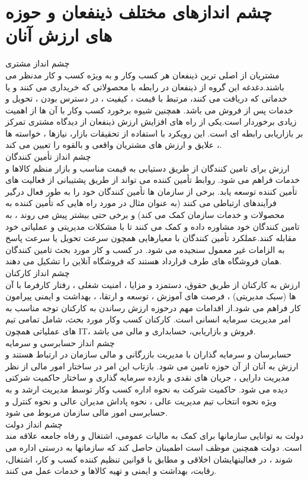\documentclass[12pt]{report}
\begin{document}
\section{چشم اندازهای مختلف ذینفعان و حوزه های ارزش آنان}
چشم انداز مشتری\\
مشتریان از اصلی ترین ذینفعان هر کسب وکار و به ویژه کسب و کار مدنظر می باشند.دغدغه این گروه از ذینفعان در رابطه با محصولاتی که خریداری می کنند و یا خدماتی که دریافت می کنند، مرتبط با قیمت ، کیفیت ، در دسترس بودن ، تحویل و خدمات پس از فروش می باشد. همچنین شیوه برخورد کسب وکار با آن ها از اهمیت زیادی برخوردار است.یکی از راه های افزایش ارزش ذینفعان از دیدگاه مشتری تمرکز بر بازاریابی رابطه ای است. این رویکرد با استفاده از تحقیقات بازار، نیازها ، خواسته ها ، علایق و ارزش های مشتریان واقعی و بالقوه را تعیین می کند.\\
چشم انداز تأمین کنندگان\\
ارزش برای تامین کنندگان از طریق دستیابی به قیمت مناسب و بازار منظم کالاها و خدمات فراهم می شود.
روابط تأمین کننده می تواند از طریق پشتیبانی از فعالیت های تأمین کننده توسعه یابد. برخی از سازمان ها تأمین کنندگان خود را به طور فعال درگیر فرآیندهای ارتباطی می کنند (به عنوان مثال در مورد راه هایی که تأمین کننده به محصولات و خدمات سازمان کمک می کند) و برخی حتی بیشتر پیش می روند ، به تامین کنندگان خود مشاوره داده و کمک می کنند تا با مشکلات مدیریتی و عملیاتی خود مقابله کنند.عملکرد تأمین کنندگان با معیارهایی همچون سرعت تحویل یا سرعت پاسخ به الزامات غیر معمول سنجیده می شود. در کسب و کار مورد بحث تامین کنندگان همان فروشگاه های طرف قرارداد هستند که فروشگاه آنلاین را تشکیل می دهند.\\
 چشم انداز کارکنان\\
ارزش به کارکنان از طریق حقوق، دستمزد و مزایا ، امنیت شغلی ، رفتار کارفرما با آن ها (سبک مدیریتی) ، فرصت های آموزش ، توسعه و ارتقا، ، بهداشت و ایمنی پیرامون کار فراهم می شود.از اقدامات مهم درحوزه ارزش رساندن به کارکنان توجه مناسب به امر مدیریت سرمایه انسانی است. کارکنان کسب وکار مورد بحث، شامل تمامی تیم های عملیاتی همچون IT، فروش و بازاریابی، حسابداری و مالی می باشد.\\
 چشم انداز حسابرسی و سرمایه\\
حسابرسان و سرمایه گذاران با مدیریت بازرگانی و مالی سازمان در ارتباط هستند و ارزش به آنان از آن حوزه تامین می شود. بازتاب این امر در ساختار امور مالی از نظر مدیریت دارایی ، جریان های نقدی و بازده سرمایه گذاری و ساختار حاکمیت شرکتی دیده می شود. حاکمیت شرکت به نحوه اداره کسب وکار توسط مدیریت ارشد و به ویژه نحوه انتخاب تیم مدیریت عالی ، نحوه پاداش مدیران عالی و نحوه کنترل و حسابرسی امور مالی سازمان مربوط می شود.\\
چشم انداز دولت\\
دولت به توانایی سازمانها برای کمک به مالیات عمومی، اشتغال و رفاه جامعه علاقه مند است. دولت همچنین موظف است اطمینان حاصل کند که سازمانها به درستی اداره می شوند ، در فعالیتهایشان اخلاقی و مطابق با قوانین تنظیم کننده کسب و کار، اشتغال، رقابت، بهداشت و ایمنی و تهیه کالاها و خدمات عمل می کنند. \\
\end{document}
